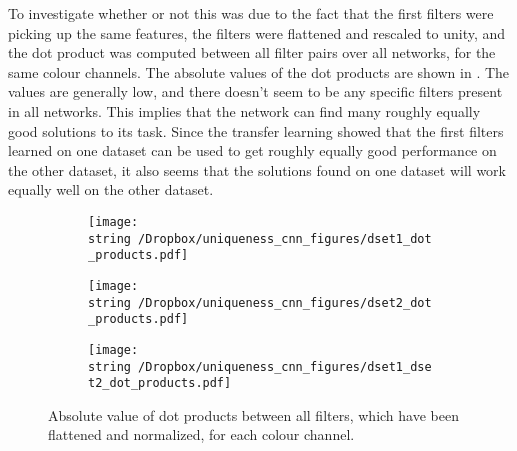 To investigate whether or not this was due to the fact that the first filters were picking up the same features, the filters were flattened and rescaled to unity, and the dot product was computed between all filter pairs over all networks, for the same colour channels. The absolute values of the dot products are shown in . The values are generally low, and there doesn't seem to be any specific filters present in all networks. This implies that the network can find many roughly equally good solutions to its task. Since the transfer learning showed that the first filters learned on one dataset can be used to get roughly equally good performance on the other dataset, it also seems that the solutions found on one dataset will work equally well on the other dataset.

\begin{figure}[h!]
  \begin{subfigure}{\textwidth}
    \texttt{[image: \\string~/Dropbox/uniqueness\_cnn\_figures/dset1\_dot\_products.pdf]}
  \end{subfigure}
  \begin{subfigure}{\textwidth}
    \texttt{[image: \\string~/Dropbox/uniqueness\_cnn\_figures/dset2\_dot\_products.pdf]}
  \end{subfigure}
  \begin{subfigure}{\textwidth}
    \texttt{[image: \\string~/Dropbox/uniqueness\_cnn\_figures/dset1\_dset2\_dot\_products.pdf]}
  \end{subfigure}
  \caption{Absolute value of dot products between all filters, which have been flattened and normalized, for each colour channel.}
  \label{fig:dot_products_cifar5}
\end{figure}

